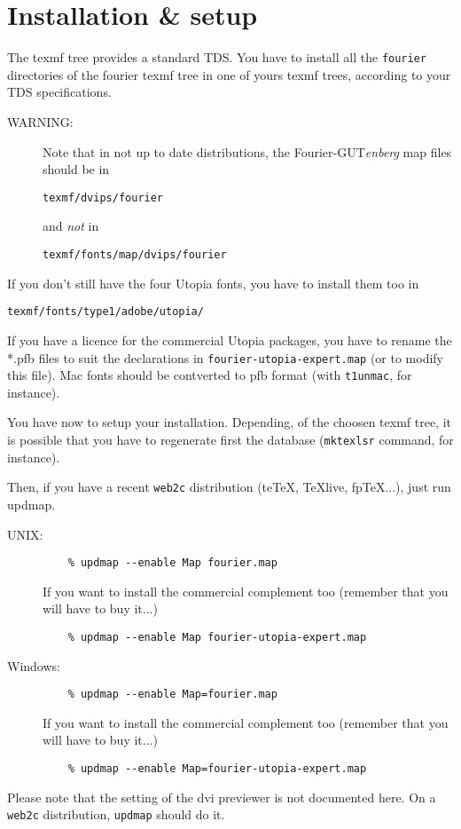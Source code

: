 \documentclass[a4paper,11pt]{article}
\newcommand{\fourier}{Fourier-GUT\textit{enberg}}
\begin{document}
\section{Installation \textsc{\&} setup}
The texmf tree provides a standard TDS.
You have to install all the \texttt{fourier} directories of the fourier texmf tree 
in one of yours texmf trees, according to your TDS specifications.

\begin{description}
\item[WARNING:] Note that in not up to date distributions, the \fourier{} map files
should be in 

\texttt{texmf/dvips/fourier}

and \emph{not} in

\texttt{texmf/fonts/map/dvips/fourier}
\end{description}
If you don't still have the four Utopia fonts, you have to install them too in

\texttt{texmf/fonts/type1/adobe/utopia/}

If you have a licence for the commercial Utopia packages, you have to 
rename the *.pfb files to suit the declarations in \texttt{fourier-utopia-expert.map} (or to 
modify this file). Mac fonts should be contverted to pfb format (with 
\texttt{t1unmac}, for instance).

You have now to setup your installation.
Depending, of the choosen texmf tree, it is possible that you have to regenerate 
first the database (\texttt{mktexlsr} command, for instance).

Then, if you have a recent \texttt{web2c} distribution 
(teTeX, TeXlive, fpTeX...), just run updmap.

\begin{description}
\item[UNIX:]\quad
\begin{verbatim}
    % updmap --enable Map fourier.map
\end{verbatim}
If you want to install the commercial complement too (remember that you will have to buy it...)
\begin{verbatim}
    % updmap --enable Map fourier-utopia-expert.map
\end{verbatim}
\item[Windows:]\quad
\begin{verbatim}
    % updmap --enable Map=fourier.map
\end{verbatim}
If you want to install the commercial complement too (remember that you will have to buy it...)
\begin{verbatim}
    % updmap --enable Map=fourier-utopia-expert.map
\end{verbatim}

\end{description}
 Please note that the setting
 of the dvi previewer is not documented here. On a \texttt{web2c} distribution, \texttt{updmap} should do it.
\end{document}
